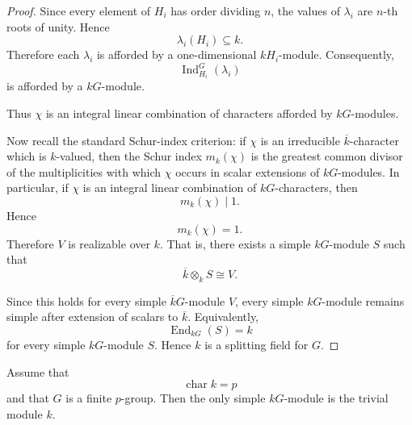 \begin{proof}
    Since every element of \(H_i\) has order dividing \(n\), the values of
    \(\lambda_i\) are \(n\)-th roots of unity. Hence
    \[
        \lambda_i(H_i)\subseteq k.
    \]
    Therefore each \(\lambda_i\) is afforded by a one-dimensional \(kH_i\)-module.
    Consequently,
    \[
        \operatorname{Ind}_{H_i}^G(\lambda_i)
    \]
    is afforded by a \(kG\)-module.

    Thus \(\chi\) is an integral linear combination of characters afforded by
    \(kG\)-modules.

    Now recall the standard Schur-index criterion: if \(\chi\) is an irreducible
    \(\overline{k}\)-character which is \(k\)-valued, then the Schur index
    \(m_k(\chi)\) is the greatest common divisor of the multiplicities with which
    \(\chi\) occurs in scalar extensions of \(kG\)-modules. In particular, if
    \(\chi\) is an integral linear combination of \(kG\)-characters, then
    \[
        m_k(\chi)\mid 1.
    \]
    Hence
    \[
        m_k(\chi)=1.
    \]
    Therefore \(V\) is realizable over \(k\). That is, there exists a simple
    \(kG\)-module \(S\) such that
    \[
        \overline{k}\otimes_k S\cong V.
    \]

    Since this holds for every simple \(\overline{k}G\)-module \(V\), every simple
    \(kG\)-module remains simple after extension of scalars to \(\overline{k}\).
    Equivalently,
    \[
        \operatorname{End}_{kG}(S)=k
    \]
    for every simple \(kG\)-module \(S\). Hence \(k\) is a splitting field for
    \(G\).
\end{proof}

\begin{proposition}
    Assume that
    \[
        \operatorname{char} k=p
    \]
    and that \(G\) is a finite \(p\)-group. Then the only simple \(kG\)-module is
    the trivial module \(k\).
\end{proposition}

